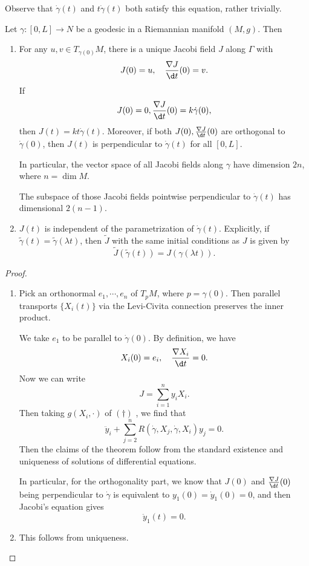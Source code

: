 \documentclass[a4paper]{article}
\begin{document}
Observe that $\dot{\gamma}(t)$ and $t \dot{\gamma}(t)$ both satisfy this equation, rather trivially.
\begin{thm}
  Let $\gamma: [0, L] \to N$ be a geodesic in a Riemannian manifold $(M, g)$. Then
  \begin{enumerate}
    \item For any $u, v \in T_{\gamma(0)}M$, there is a unique Jacobi field $J$ along $\Gamma$ with
      \[
        J(0) = u,\quad \frac{\nabla J}{\d t}(0) = v.
      \]
      If
      \[
        J(0) = 0, \frac{\nabla J}{\d t}(0) = k \dot{\gamma}(0),
      \]
      then $J(t) = kt \dot{\gamma}(t)$. Moreover, if both $J(0), \frac{\nabla J}{\d t}(0)$ are orthogonal to $\dot{\gamma}(0)$, then $J(t)$ is perpendicular to $\dot{\gamma}(t)$ for all $[0, L]$.

      In particular, the vector space of all Jacobi fields along $\gamma$ have dimension $2n$, where $n = \dim M$.

      The subspace of those Jacobi fields pointwise perpendicular to $\dot{\gamma}(t)$ has dimensional $2(n - 1)$.
    \item $J(t)$ is independent of the parametrization of $\dot{\gamma}(t)$. Explicitly, if $\tilde{\gamma}(t) = \tilde{\gamma}(\lambda t)$, then $\tilde{J}$ with the same initial conditions as $J$ is given by
      \[
        \tilde{J}(\tilde{\gamma}(t)) = J(\gamma(\lambda t)).
      \]
  \end{enumerate}
\end{thm}

\begin{proof}\leavevmode
  \begin{enumerate}
    \item Pick an orthonormal $e_1,\cdots, e_n$ of $T_p M$, where $p = \gamma(0)$. Then parallel transports $\{X_i(t)\}$ via the Levi-Civita connection preserves the inner product.

      We take $e_1$ to be parallel to $\dot{\gamma}(0)$. By definition, we have
      \[
        X_i(0) = e_i,\quad \frac{\nabla X_i}{\d t} = 0.
      \]
      Now we can write
      \[
        J = \sum_{i = 1}^n y_i X_i.
      \]
      Then taking $g(X_i, \cdot)$ of $(\dagger)$ , we find that
      \[
        \ddot{y}_i + \sum_{j = 2}^n R(\dot{\gamma}, X_j, \dot{\gamma}, X_i) y_j = 0.
      \]
      Then the claims of the theorem follow from the standard existence and uniqueness of solutions of differential equations.

      In particular, for the orthogonality part, we know that $J(0)$ and $\frac{\nabla J}{\d t}(0)$ being perpendicular to $\dot{\gamma}$ is equivalent to $y_1(0) = \dot{y}_1 (0) = 0$, and then Jacobi's equation gives
      \[
        \ddot{y}_1(t) = 0.
      \]
    \item This follows from uniqueness.
  \end{enumerate}
\end{proof}
\end{document}
